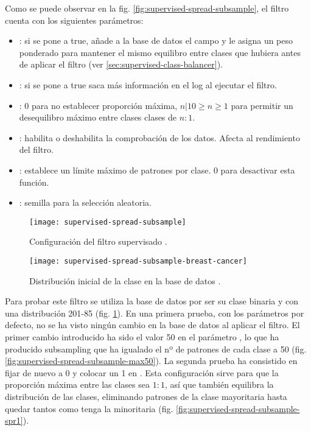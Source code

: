 Como se puede observar en la fig. \ref{fig:supervised-spread-subsample}, el filtro  cuenta con los siguientes parámetros:
\begin{itemize}
    \item {}: si se pone a true, añade a la base de datos el campo  y le asigna un peso ponderado para mantener el mismo equilibro entre clases que hubiera antes de aplicar el filtro (ver \ref{sec:supervised-class-balancer}).
    \item {}: si se pone a true saca más información en el log al ejecutar el filtro.
    \item {}: 0 para no establecer proporción máxima, $n | 10\geq n\geq 1$ para permitir un desequilibro máximo entre clases clases de $n:1$.
    \item {}: habilita o deshabilita la comprobación de los datos. Afecta al rendimiento del filtro.
    \item {}: establece un límite máximo de patrones por clase. 0 para desactivar esta función.
    \item {}: semilla para la selección aleatoria.
\end{itemize}


\begin{figure}[H]
    \centering
    \begin{minipage}{0.50\textwidth}
        \centering
        \texttt{[image: supervised-spread-subsample]}
        \caption{Configuración del filtro supervisado .}
        \label{fig:supervised-spread-subsample}
    \end{minipage}\hfill
    \begin{minipage}{0.50\textwidth}
        \centering
        \texttt{[image: supervised-spread-subsample-breast-cancer]}
        \caption{Distribución inicial de la clase en la base de datos .}
        \label{fig:supervised-spread-subsample-breast-cancer}
    \end{minipage}
\end{figure}

Para probar este filtro se utiliza la base de datos  por ser su clase binaria y con una distribución 201-85 (fig. \ref{fig:supervised-spread-subsample-breast-cancer}). En una primera prueba, con los parámetros por defecto, no se ha visto ningún cambio en la base de datos al aplicar el filtro. El primer cambio introducido ha sido el valor 50 en el parámetro , lo que ha producido subsampling que ha igualado el nº de patrones de cada clase a 50 (fig. \ref{fig:supervised-spread-subsample-max50}). La segunda prueba ha consistido en fijar de nuevo  a 0 y colocar un 1 en . Esta configuración sirve para que la proporción máxima entre las clases sea $1:1$, así que también equilibra la distribución de las clases, eliminando patrones de la clase mayoritaria hasta quedar tantos como tenga la minoritaria (fig. \ref{fig:supervised-spread-subsample-spr1}).



